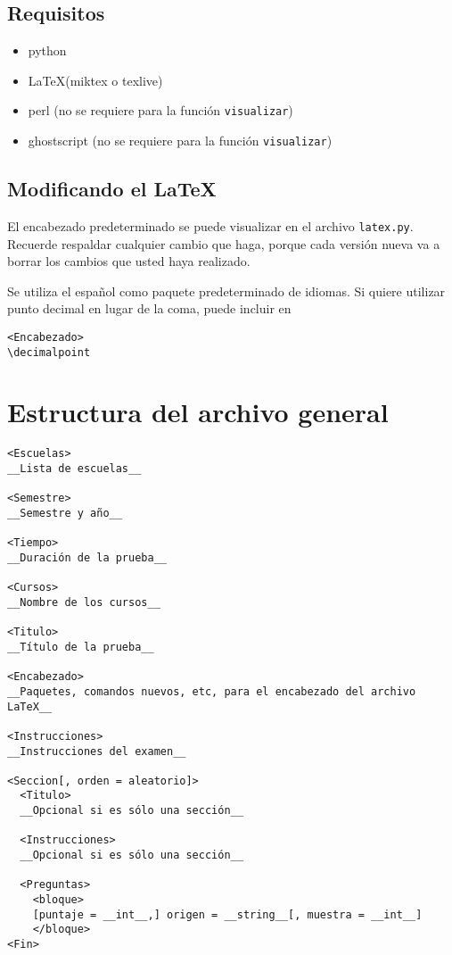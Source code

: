 \documentclass[12pt]{article}
\theoremstyle{definition}
\begin{document}
\subsection{Requisitos}
\begin{itemize}
  \item python
  \item \LaTeX (miktex o texlive)
  \item perl (no se requiere para la funci\'on \verb|visualizar|)
  \item ghostscript (no se requiere para la funci\'on \verb|visualizar|)
\end{itemize}

\subsection{Modificando el \LaTeX}
El encabezado predeterminado se puede visualizar en el archivo \verb|latex.py|. Recuerde respaldar cualquier cambio que haga, porque cada versi\'on nueva va a borrar los cambios que usted haya realizado.

Se utiliza el espa\~nol como paquete predeterminado de idiomas. Si quiere utilizar punto decimal en lugar de la coma, puede incluir en 
\begin{verbatim}
<Encabezado>
\decimalpoint
\end{verbatim}

\section{Estructura del archivo general}
\begin{verbatim}
<Escuelas>
__Lista de escuelas__

<Semestre>
__Semestre y año__

<Tiempo>
__Duración de la prueba__

<Cursos>
__Nombre de los cursos__

<Titulo>
__Título de la prueba__

<Encabezado>
__Paquetes, comandos nuevos, etc, para el encabezado del archivo LaTeX__

<Instrucciones>
__Instrucciones del examen__

<Seccion[, orden = aleatorio]>
  <Titulo>
  __Opcional si es sólo una sección__

  <Instrucciones>
  __Opcional si es sólo una sección__

  <Preguntas>
    <bloque>
    [puntaje = __int__,] origen = __string__[, muestra = __int__]
    </bloque>
<Fin>
\end{verbatim}
\end{document}
